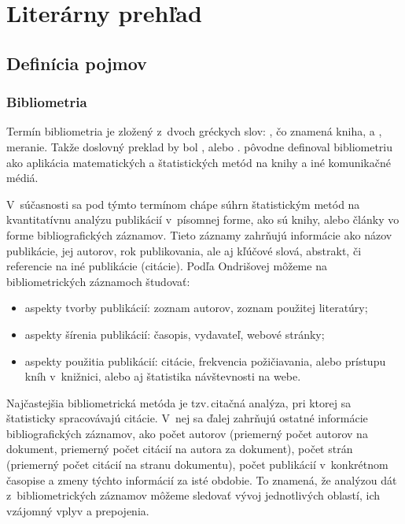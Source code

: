 \chapter{Literárny prehľad}

\section{Definícia pojmov}

\subsection{Bibliometria}

Termín bibliometria je zložený z~dvoch gréckych slov:
, čo znamená kniha, a
, meranie.  Takže doslovný
preklad by bol , alebo .
\citet{Pritchard1969} pôvodne definoval bibliometriu ako aplikácia
matematických a štatistických metód na knihy a iné komunikačné médiá.

V~súčasnosti sa pod týmto termínom chápe súhrn štatistickým metód na
kvantitatívnu analýzu publikácií v~písomnej forme, ako sú knihy, alebo články
vo forme bibliografických záznamov.  Tieto záznamy zahrňujú informácie ako
názov publikácie, jej autorov, rok publikovania, ale aj kľúčové slová,
abstrakt, či referencie na iné publikácie (citácie).  Podľa Ondrišovej
\citeyearpar{Ondrisova2011} môžeme na bibliometrických záznamoch študovať:

\begin{itemize}
\item aspekty tvorby publikácií:  zoznam autorov, zoznam použitej literatúry;
\item aspekty šírenia publikácií:  časopis, vydavateľ, webové stránky;
\item aspekty použitia publikácií:  citácie, frekvencia  požičiavania, alebo
    prístupu kníh v~knižnici, alebo aj štatistika návštevnosti na webe.

\end{itemize}

Najčastejšia bibliometrická metóda je tzv.\,citačná analýza,  pri ktorej sa štatisticky spracovávajú citácie.  V~nej sa ďalej
zahrňujú ostatné informácie bibliografických záznamov, ako počet autorov
(priemerný počet autorov na dokument, priemerný počet citácií na autora za
dokument), počet strán (priemerný počet citácií na stranu dokumentu), počet
publikácií v~konkrétnom časopise a zmeny týchto informácií za isté obdobie.  To
znamená, že analýzou dát z~bibliometrických záznamov môžeme sledovať vývoj
jednotlivých oblastí, ich vzájomný vplyv a prepojenia.

